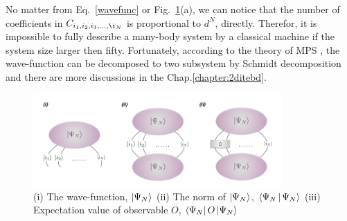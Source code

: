 No matter from Eq.~\ref{wavefunc} or Fig.~\ref{fig225}(a), we can notice that the number of coefficients in $C_{i_1,i_2,i_3,\ldots,\i_N}$ is proportional to $d^N$, directly. Therefor, it is impossible to fully describe a many-body system by a classical machine if the system size larger then fifty. Fortunately, according to the theory of MPS \cite{PhysRevB.73.094423} \cite{PhysRevLett.75.3537}, the wave-function can be decomposed to two subsystem by Schmidt decomposition and there are more discussions in the Chap.\ref{chapter:2ditebd}. 
\begin{figure}[ht]
	\centering
	\includegraphics[width=0.85\textwidth]{figures/fig225.png}
	\caption[Represent wave-function of quntum states of TN]{(i) The wave-function, $\Ket{\Psi_N}$ (ii) The norm of $\Ket{\Psi_N}$, $\Braket{\Psi_N|\Psi_N}$ (iii) Expectation value of observable $O$, $\Bra{\Psi_N}O\Ket{\Psi_N}$}
	\label{fig225}
\end{figure}
